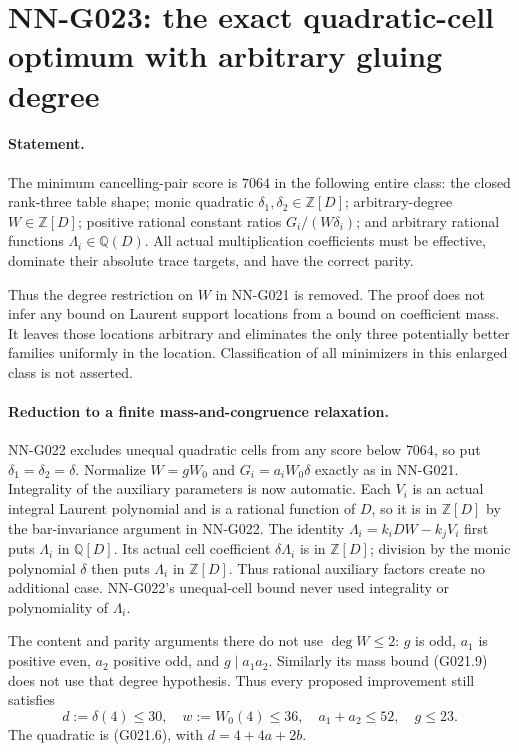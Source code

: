 \section{NN-G023: the exact quadratic-cell optimum with arbitrary gluing degree}
\paragraph{Statement.}
The minimum cancelling-pair score is $7064$ in the following
entire class: the closed rank-three table shape; monic quadratic
$\delta_1,\delta_2\in\mathbb Z[D]$; arbitrary-degree
$W\in\mathbb Z[D]$; positive rational constant ratios
$G_i/(W\delta_i)$; and arbitrary rational functions
$\Lambda_i\in\mathbb Q(D)$. All actual multiplication
coefficients must be effective, dominate their absolute trace
targets, and have the correct parity.

Thus the degree restriction on $W$ in NN-G021 is removed.
The proof does not infer any bound on Laurent support locations
from a bound on coefficient mass. It leaves those locations
arbitrary and eliminates the only three potentially better
families uniformly in the location. Classification of all
minimizers in this enlarged class is not asserted.

\paragraph{Reduction to a finite mass-and-congruence relaxation.}
NN-G022 excludes unequal quadratic cells from any score below
$7064$, so put $\delta_1=\delta_2=\delta$. Normalize
$W=gW_0$ and $G_i=a_iW_0\delta$ exactly as in NN-G021.
Integrality of the auxiliary parameters is now automatic.
Each $V_i$ is an actual integral Laurent polynomial and
is a rational function of $D$, so it is in $\mathbb Z[D]$
by the bar-invariance argument in NN-G022. The identity
$\Lambda_i=k_iDW-k_jV_i$ first puts $\Lambda_i$ in
$\mathbb Q[D]$. Its actual cell coefficient
$\delta\Lambda_i$ is in $\mathbb Z[D]$; division by the
monic polynomial $\delta$ then puts $\Lambda_i$ in
$\mathbb Z[D]$. Thus rational auxiliary factors create
no additional case. NN-G022's unequal-cell bound never
used integrality or polynomiality of $\Lambda_i$.

The content and parity arguments there do not use $\deg W\le2$:
$g$ is odd, $a_1$ is positive even, $a_2$ positive odd,
and $g\mid a_1a_2$. Similarly its mass bound (G021.9)
does not use that degree hypothesis. Thus every proposed
improvement still satisfies
\[
 d:=\delta(4)\le30,\quad w:=W_0(4)\le36,
 \quad a_1+a_2\le52,\quad g\le23.
 \tag{G023.1}
\]
The quadratic is (G021.6), with $d=4+4a+2b$.

